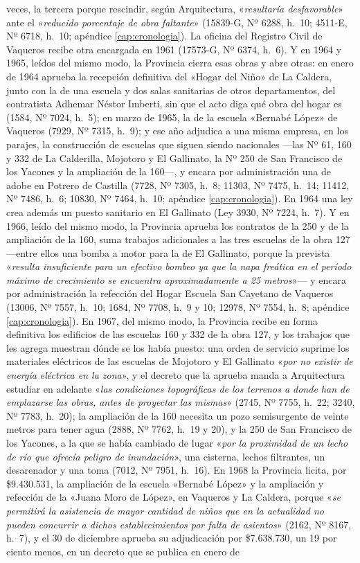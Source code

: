 veces, la tercera porque rescindir, según Arquitectura, «\textit{resultaría desfavorable}» ante el «\textit{reducido porcentaje de obra faltante}» (15839-G, Nº 6288, h.\ 10; 4511-E, Nº 6718, h.\ 10; apéndice \ref{cap:cronologia}). La oficina del Registro Civil de Vaqueros recibe otra encargada en 1961 (17573-G, Nº 6374, h.\ 6). Y en 1964 y 1965, leídos del mismo modo, la Provincia cierra esas obras y abre otras: en enero de 1964 aprueba la recepción definitiva del «Hogar del Niño» de La Caldera, junto con la de una escuela y dos salas sanitarias de otros departamentos, del contratista Adhemar Néstor Imberti, sin que el acto diga qué obra del hogar es (1584, Nº 7024, h.\ 5); en marzo de 1965, la de la escuela «Bernabé López» de Vaqueros (7929, Nº 7315, h.\ 9); y ese año adjudica a una misma empresa, en los parajes, la construcción de escuelas que siguen siendo nacionales ---las Nº 61, 160 y 332 de La Calderilla, Mojotoro y El Gallinato, la Nº 250 de San Francisco de los Yacones y la ampliación de la 160---, y encara por administración una de adobe en Potrero de Castilla (7728, Nº 7305, h.\ 8; 11303, Nº 7475, h.\ 14; 11412, Nº 7486, h.\ 6; 10830, Nº 7464, h.\ 10; apéndice \ref{cap:cronologia}). En 1964 una ley crea además un puesto sanitario en El Gallinato (Ley 3930, Nº 7224, h.\ 7). Y en 1966, leído del mismo modo, la Provincia aprueba los contratos de la 250 y de la ampliación de la 160, suma trabajos adicionales a las tres escuelas de la obra 127 ---entre ellos una bomba a motor para la de El Gallinato, porque la prevista «\textit{resulta insuficiente para un efectivo bombeo ya que la napa freática en el período máximo de crecimiento se encuentra aproximadamente a 25 metros}»--- y encara por administración la refección del Hogar Escuela San Cayetano de Vaqueros (13006, Nº 7557, h.\ 10; 1684, Nº 7708, h.\ 9 y 10; 12978, Nº 7554, h.\ 8; apéndice \ref{cap:cronologia}). En 1967, del mismo modo, la Provincia recibe en forma definitiva los edificios de las escuelas 160 y 332 de la obra 127, y los trabajos que les agrega muestran dónde se los había puesto: una orden de servicio suprime los materiales eléctricos de las escuelas de Mojotoro y El Gallinato «\textit{por no existir de energía eléctrica en la zona}», y el decreto que la aprueba manda a Arquitectura estudiar en adelante «\textit{las condiciones topográficas de los terrenos a donde han de emplazarse las obras, antes de proyectar las mismas}» (2745, Nº 7755, h.\ 22; 3240, Nº 7783, h.\ 20); la ampliación de la 160 necesita un pozo semisurgente de veinte metros para tener agua (2888, Nº 7762, h.\ 19 y 20), y la 250 de San Francisco de los Yacones, a la que se había cambiado de lugar «\textit{por la proximidad de un lecho de río que ofrecía peligro de inundación}», una cisterna, lechos filtrantes, un desarenador y una toma (7012, Nº 7951, h.\ 16). En 1968 la Provincia licita, por \$9.430.531, la ampliación de la escuela «Bernabé López» y la ampliación y refección de la «Juana Moro de López», en Vaqueros y La Caldera, porque «\textit{se permitirá la asistencia de mayor cantidad de niños que en la actualidad no pueden concurrir a dichos establecimientos por falta de asientos}» (2162, Nº 8167, h.\ 7), y el 30 de diciembre aprueba su adjudicación por \$7.638.730, un 19 por ciento menos, en un decreto que se publica en enero de 